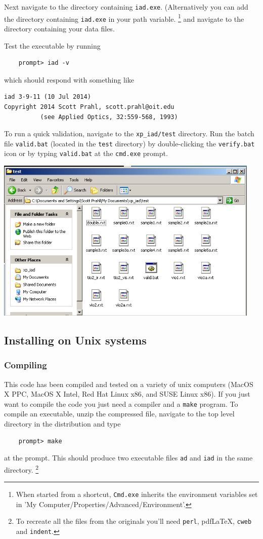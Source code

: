 \documentclass{article}
\newcommand\pdflatex{pdf\LaTeX}
\newcommand\iadprog{\texttt{iad}}
\begin{document}
Next navigate to the directory containing \texttt{iad.exe}.  
(Alternatively you 
can add the directory containing \texttt{iad.exe} in your path variable.%
\footnote{
When started from a shortcut, \texttt{Cmd.exe} inherits the environment variables set in 
'My Computer/Properties/Advanced/Environment'.} and
navigate to the directory containing your data files.

Test the executable by running
\begin{verbatim}
    prompt> iad -v
\end{verbatim}
which should respond with something like
\begin{verbatim}
iad 3-9-11 (10 Jul 2014)
Copyright 2014 Scott Prahl, scott.prahl@oit.edu
          (see Applied Optics, 32:559-568, 1993)
\end{verbatim}

To run a quick validation, navigate to the \texttt{xp\_iad/test} directory.  Run the
batch file \texttt{valid.bat} (located in the \texttt{test} directory) by
double-clicking the \texttt{verify.bat} icon or by typing \texttt{valid.bat} at
the \texttt{cmd.exe} prompt.
\begin{center}
\includegraphics[width=5in]{valid.png}
\end{center}

\subsection{Installing on Unix systems}

\subsubsection{Compiling}

This code has been compiled and tested on a variety of unix computers (MacOS X PPC, MacOS X Intel,
Red Hat Linux x86, and SUSE Linux x86).  
If you just want to compile the code you just need a compiler and a \texttt{make} program.
To compile an executable,  unzip the compressed file, navigate to the top level directory in the distribution and type
\begin{verbatim}
    prompt> make
\end{verbatim}
at the prompt.  This should produce two executable files \texttt{ad} and \iadprog{} in the 
same directory.%
\footnote{To recreate all the files
from the originals you'll need \texttt{perl}, \pdflatex{}, \texttt{cweb} and \texttt{indent}.}
\end{document}
